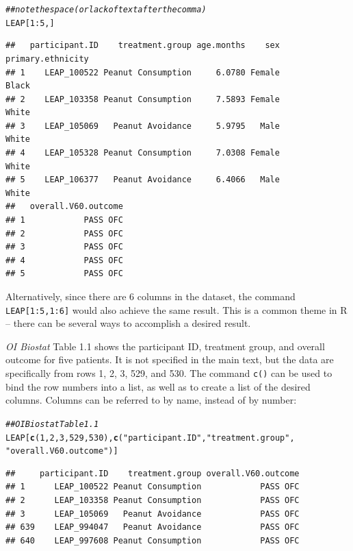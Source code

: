 \documentclass{article}\usepackage[]{graphicx}\usepackage[]{color}
\makeatletter
\newcommand{\hlnum}[1]{\textcolor[rgb]{0.686,0.059,0.569}{#1}}%
\newcommand{\hlstr}[1]{\textcolor[rgb]{0.192,0.494,0.8}{#1}}%
\newcommand{\hlcom}[1]{\textcolor[rgb]{0.678,0.584,0.686}{\textit{#1}}}%
\newcommand{\hlopt}[1]{\textcolor[rgb]{0,0,0}{#1}}%
\newcommand{\hlstd}[1]{\textcolor[rgb]{0.345,0.345,0.345}{#1}}%
\newcommand{\hlkwd}[1]{\textcolor[rgb]{0.737,0.353,0.396}{\textbf{#1}}}%
\newenvironment{kframe}{%
 \def\at@end@of@kframe{}%
 \ifinner\ifhmode%
  \def\at@end@of@kframe{\end{minipage}}%
  \begin{minipage}{\columnwidth}%
 \fi\fi%
 \def\FrameCommand##1{\hskip\@totalleftmargin \hskip-\fboxsep
 \colorbox{shadecolor}{##1}\hskip-\fboxsep
     \hskip-\linewidth \hskip-\@totalleftmargin \hskip\columnwidth}%
 \MakeFramed {\advance\hsize-\width
   \@totalleftmargin\z@ \linewidth\hsize
   \@setminipage}}%
 {\par\unskip\endMakeFramed%
 \at@end@of@kframe}
\newenvironment{knitrout}{}{} %
\makeatother
\begin{document}
\begin{knitrout}
\color{fgcolor}\begin{kframe}
\begin{alltt}
\hlcom{## note the space (or lack of text after the comma)}
\hlstd{LEAP[}\hlnum{1}\hlopt{:}\hlnum{5}\hlstd{, ]}
\end{alltt}
\begin{verbatim}
##   participant.ID    treatment.group age.months    sex primary.ethnicity
## 1    LEAP_100522 Peanut Consumption     6.0780 Female             Black
## 2    LEAP_103358 Peanut Consumption     7.5893 Female             White
## 3    LEAP_105069   Peanut Avoidance     5.9795   Male             White
## 4    LEAP_105328 Peanut Consumption     7.0308 Female             White
## 5    LEAP_106377   Peanut Avoidance     6.4066   Male             White
##   overall.V60.outcome
## 1            PASS OFC
## 2            PASS OFC
## 3            PASS OFC
## 4            PASS OFC
## 5            PASS OFC
\end{verbatim}
\end{kframe}
\end{knitrout}

Alternatively, since there are 6 columns in the dataset, the command \texttt{LEAP[1:5,1:6]} would also achieve the same result. This is a common theme in \textsf{R} -- there can be several ways to accomplish a desired result. 

\textit{OI Biostat} Table 1.1 shows the participant ID, treatment group, and overall outcome for five patients. It is not specified in the main text, but the data are specifically from rows 1, 2, 3, 529, and 530. The command \texttt{c()} can be used to bind the row numbers into a list, as well as to create a list of the desired columns. Columns can be referred to by name, instead of by number:

\begin{knitrout}
\color{fgcolor}\begin{kframe}
\begin{alltt}
\hlcom{## OI Biostat Table 1.1}
\hlstd{LEAP[}\hlkwd{c}\hlstd{(}\hlnum{1}\hlstd{,} \hlnum{2}\hlstd{,} \hlnum{3}\hlstd{,} \hlnum{529}\hlstd{,} \hlnum{530}\hlstd{),}\hlkwd{c}\hlstd{(}\hlstr{"participant.ID"}\hlstd{,} \hlstr{"treatment.group"}\hlstd{,}
                         \hlstr{"overall.V60.outcome"}\hlstd{)]}
\end{alltt}
\begin{verbatim}
##     participant.ID    treatment.group overall.V60.outcome
## 1      LEAP_100522 Peanut Consumption            PASS OFC
## 2      LEAP_103358 Peanut Consumption            PASS OFC
## 3      LEAP_105069   Peanut Avoidance            PASS OFC
## 639    LEAP_994047   Peanut Avoidance            PASS OFC
## 640    LEAP_997608 Peanut Consumption            PASS OFC
\end{verbatim}
\end{kframe}
\end{knitrout}
\end{document}
